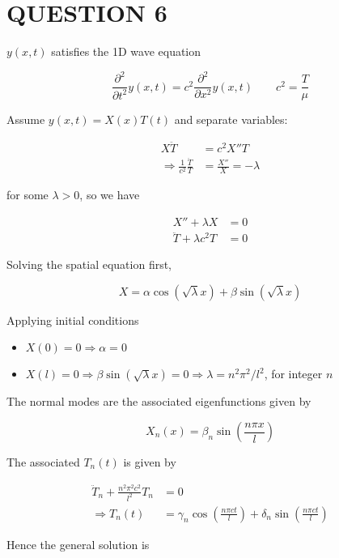 \documentclass[a4paper]{article}
\begin{document}
\section{QUESTION 6}


$ y(x,t) $ satisfies the 1D wave equation

\[ \frac{\partial^{2} }{\partial t^2} y(x,t) = c^{2} \frac{\partial^{2} }{\partial x^{2}} y(x,t) \qquad c^{2} = \frac{T}{\mu} \]


Assume $ y(x,t) = X(x) T(t) $ and separate variables:

\begin{align*}
X \ddot{T} & = c^{2} X'' T \\
\Rightarrow \frac{1}{c^{2}} \frac{\ddot{T}}{T}  & = \frac{X''}{X} = - \lambda 
\end{align*}

for some $ \lambda > 0 $, so we have

\begin{align*}
X'' + \lambda X& =0 \\
\ddot{T}  + \lambda c^{2} T & = 0 
\end{align*}

Solving the spatial equation first,

\[ X = \alpha \cos ( \sqrt{\lambda} x ) + \beta \sin ( \sqrt{\lambda} x ) \]

Applying initial conditions

\begin{itemize}
	\item $ X(0) = 0 \Rightarrow \alpha = 0$
	\item $ X(l) = 0 \Rightarrow \beta \sin ( \sqrt{\lambda} x ) = 0 \Rightarrow \lambda = n^{2} \pi^{2} / l^{2} $, for integer $ n $
\end{itemize}

The normal modes are the associated eigenfunctions given by

\[ X_{n}(x) = \beta_{n} \sin \left(  \frac{n \pi x}{l} \right)  \]

The associated $ T_{n}(t) $ is given by

\begin{align*}
 \ddot{T}_{n} + \frac{n^{2} \pi^{2} c^{2} }{l^{2}}  T_{n} & = 0 \\
\Rightarrow T_{n}(t) & = \gamma_{n} \cos \left(  \frac{n \pi c t}{l} \right) + \delta_{n} \sin \left(  \frac{n \pi c t}{l} \right)  
\end{align*}

Hence the general solution is
\end{document}

